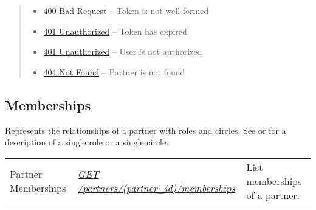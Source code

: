 \documentclass[letterpaper,10pt,english]{sphinxmanual}
\begin{document}
\begin{fulllineitems}
\begin{quote}
\begin{description}
\begin{itemize}
\item {} 
\href{http://www.w3.org/Protocols/rfc2616/rfc2616-sec10.html\#sec10.4.1}{400 Bad Request} -- Token is not well-formed

\item {} 
\href{http://www.w3.org/Protocols/rfc2616/rfc2616-sec10.html\#sec10.4.2}{401 Unauthorized} -- Token has expired

\item {} 
\href{http://www.w3.org/Protocols/rfc2616/rfc2616-sec10.html\#sec10.4.2}{401 Unauthorized} -- User is not authorized

\item {} 
\href{http://www.w3.org/Protocols/rfc2616/rfc2616-sec10.html\#sec10.4.5}{404 Not Found} -- Partner is not found

\end{itemize}

\end{description}\end{quote}

\end{fulllineitems}



\subsection{Memberships}
\label{\detokenize{resources/partner:memberships}}
Represents the relationships of a partner with roles and circles. See {\hyperref[\detokenize{resources/role:role}]{}} or {\hyperref[\detokenize{resources/circle:circle}]{}} for a description of a single role or a single circle.

\noindent\begin{tabulary}{\linewidth}{|L|L|L|}
\hline
{}\relax &\relax &\relax \\
\hline
Partner Memberships
&
{\hyperref[\detokenize{resources/partner:get--partners-(partner_id)-memberships}]{\emph{GET /partners/(partner\_id)/memberships}}}
&
List memberships of a partner.
\\
\hline\end{tabulary}


\begin{DUlineblock}{0em}
\item[] 
\end{DUlineblock}
\end{document}
